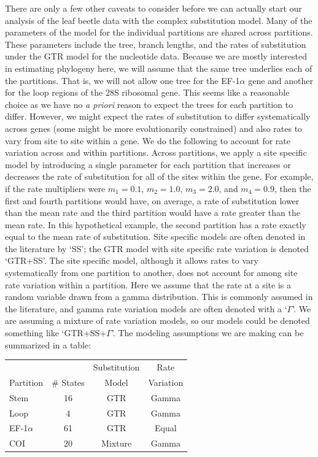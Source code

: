 \documentclass{svmult}
\begin{document}
There are only a few other caveats to consider before we can actually start our analysis of the leaf beetle data with the complex substitution model. Many of
the parameters of the model for the individual partitions are shared across partitions. These parameters include the tree, branch lengths, and the rates of 
substitution under the GTR model for the nucleotide data. Because we are mostly interested in estimating phylogeny here, we will assume that the same tree underlies
each of the partitions. That is, we will not allow one tree for the EF-1$\alpha$ gene and another for the loop regions of the 28S ribosomal gene. This seems
like a reasonable choice as we have no {\it a priori} reason to expect the trees for each partition to differ. However, we might expect the rates of substitution to differ
systematically across genes (some might be more evolutionarily constrained) and also rates to vary from site to site within a gene. We do the following to account
for rate variation across and within partitions. Across partitions, we apply a site specific model by introducing a single parameter for each partition that increases or
decreases the rate of substitution for all of the sites within the gene. For example, if the rate multipliers were $m_1 = 0.1$, $m_2 = 1.0$, $m_3 = 2.0$, and
$m_4 = 0.9$, then the first and fourth partitions would have, on average, a rate of substitution lower than the mean rate and the third partition would have a rate
greater than the mean rate. In this hypothetical example, the second partition has a rate exactly equal to the mean rate of substitution. Site specific models are
often denoted in the literature by `SS'; the GTR model with site specific rate variation is denoted `GTR+SS'. The site specific model, although it allows rates to
vary systematically from one partition to another, does not account for among site rate variation within a partition. Here we assume that the rate at a site is
a random variable drawn from a gamma distribution. This is commonly assumed in the literature, and gamma rate variation models are often denoted with
a `$\Gamma$'. We are assuming a mixture of rate variation models, so our models could be denoted something like `GTR+SS+$\Gamma$'. The modeling assumptions
we are making can be summarized in a table:
\begin{center}
\begin{tabular}{lccc}
                &                  & Substitution & Rate \\
Partition & \# States & Model           & Variation \\ \hline
Stem & 16 & GTR & Gamma \\
Loop & 4 & GTR & Gamma \\
EF-1$\alpha$ & 61 & GTR & Equal \\
COI & 20 & Mixture & Gamma \\ 
\end{tabular}
\end{center}
\end{document}

